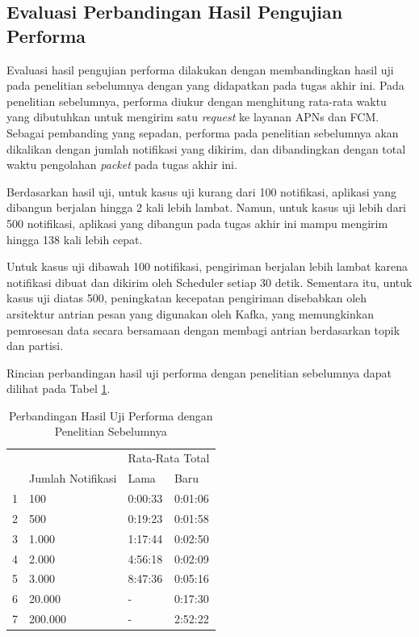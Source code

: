 \subsection{Evaluasi Perbandingan Hasil Pengujian Performa}
\par Evaluasi hasil pengujian performa dilakukan dengan membandingkan hasil uji pada penelitian sebelumnya dengan yang didapatkan pada tugas akhir ini. Pada penelitian sebelumnya, performa diukur dengan menghitung rata-rata waktu yang dibutuhkan untuk mengirim satu \textit{request} ke layanan APNs dan FCM. Sebagai pembanding yang sepadan, performa pada penelitian sebelumnya akan dikalikan dengan jumlah notifikasi yang dikirim, dan dibandingkan dengan total waktu pengolahan \textit{packet} pada tugas akhir ini.
\par Berdasarkan hasil uji, untuk kasus uji kurang dari 100 notifikasi, aplikasi yang dibangun berjalan hingga 2 kali lebih lambat. Namun, untuk kasus uji lebih dari 500 notifikasi, aplikasi yang dibangun pada tugas akhir ini mampu mengirim hingga 138 kali lebih cepat.
\par Untuk kasus uji dibawah 100 notifikasi, pengiriman berjalan lebih lambat karena notifikasi dibuat dan dikirim oleh Scheduler setiap 30 detik. Sementara itu, untuk kasus uji diatas 500, peningkatan kecepatan pengiriman disebabkan oleh arsitektur antrian pesan yang digunakan oleh Kafka, yang memungkinkan pemrosesan data secara bersamaan dengan membagi antrian berdasarkan topik dan partisi.
\par Rincian perbandingan hasil uji performa dengan penelitian sebelumnya dapat dilihat pada Tabel \ref{t:perbandingan-performa}.
\begin{longtable}{|p{0.5cm}|p{3cm}|p{2.5cm}|p{2.5cm}|}
	\caption{Perbandingan Hasil Uji Performa dengan Penelitian Sebelumnya} \label{t:perbandingan-performa} \\ \hline
	\rowcolor{lightgray} & & \multicolumn{2}{c|}{Rata-Rata Total} \\ \hhline{~~|*2{-}|}
	\rowcolor{lightgray} \multirow{-2}{*}{No} & \multirow{-2}{*}{Jumlah Notifikasi} & Lama & Baru \\ \hline
	\endhead
	1 & 100 & 0:00:33 & 0:01:06 \\ \hline
	2 & 500 & 0:19:23 & 0:01:58 \\ \hline
	3 & 1.000 & 1:17:44 & 0:02:50 \\ \hline
	4 & 2.000 & 4:56:18 & 0:02:09 \\ \hline
	5 & 3.000 & 8:47:36 & 0:05:16 \\ \hline
	6 & 20.000 & - & 0:17:30 \\ \hline
	7 & 200.000 & - & 2:52:22 \\ \hline
\end{longtable}

